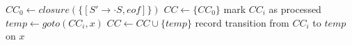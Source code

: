 \documentclass[varwidth=\maxdimen]{standalone}
\begin{document}
\begin{algorithmic}[1] %
  \State $CC_0 \gets closure(\{[S'\to \cdot S,eof]\})$
  \State $CC \gets \{CC_0\}$
      \State mark $CC_i$ as processed
        \State $temp \gets goto(CC_i,x)$
          \State $CC \gets CC\cup\{temp\}$
        \EndIf
        \State record transition from $CC_i$ to $temp$ on $x$
      \EndFor
    \EndFor
  \EndWhile
\end{algorithmic}
\end{document}
